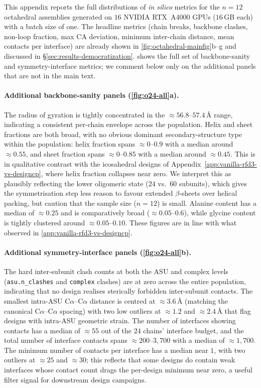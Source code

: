 \documentclass{article}
\theoremstyle{plain}
\theoremstyle{definition}
\theoremstyle{remark}
\begin{document}
This appendix reports the full distributions of \emph{in silico} metrics for the $n=12$ octahedral assemblies generated on $16$ NVIDIA RTX~A4000 GPUs ($16$\,GB each) with a batch size of one. The headline metrics (chain breaks, backbone clashes, non-loop fraction, max CA deviation, minimum inter-chain distance, mean contacts per interface) are already shown in \cref{fig:octahedral-mainfig}b--g and discussed in \S\ref{sec:results-democratization}.  shows the full set of backbone-sanity and symmetry-interface metrics; we comment below only on the additional panels that are not in the main text.

\paragraph{Additional backbone-sanity panels (\cref{fig:o24-all}a).} The radius of gyration is tightly concentrated in the $\approx 56.8$--$57.4$\,\AA{} range, indicating a consistent per-chain envelope across the population. Helix and sheet fractions are both broad, with no obvious dominant secondary-structure type within the population: helix fraction spans $\approx 0$--$0.9$ with a median around $\approx 0.55$, and sheet fraction spans $\approx 0$--$0.85$ with a median around $\approx 0.45$. This is in qualitative contrast with the icosahedral designs of Appendix~\ref{app:vanilla-rfd3-vs-designcp}, where helix fraction collapses near zero. We interpret this as plausibly reflecting the lower oligomeric state ($24$ vs.\ $60$ subunits), which gives the symmetrisation step less reason to favour extended $\beta$-sheets over helical packing, but caution that the sample size ($n=12$) is small. Alanine content has a median of $\approx 0.25$ and is comparatively broad ($\approx 0.05$--$0.6$), while glycine content is tightly clustered around $\approx 0.05$--$0.10$. These figures are in line with what observed in \cref{app:vanilla-rfd3-vs-designcp}.

\paragraph{Additional symmetry-interface panels (\cref{fig:o24-all}b).} The hard inter-subunit clash counts at both the ASU and complex levels (\texttt{asu.n\_clashes} and \texttt{complex} clashes) are at zero across the entire population, indicating that no design realises sterically forbidden inter-subunit contacts. The smallest intra-ASU C$\alpha$--C$\alpha$ distance is centred at $\approx 3.6$\,\AA{} (matching the canonical C$\alpha$--C$\alpha$ spacing) with two low outliers at $\approx 1.2$ and $\approx 2.4$\,\AA{} that flag designs with intra-ASU geometric strain. The number of interfaces showing contacts has a median of $\approx 55$ out of the $24$ chains' interface budget, and the total number of interface contacts spans $\approx 200$--$3{,}700$ with a median of $\approx 1{,}700$. The minimum number of contacts per interface has a median near $1$, with two outliers at $\approx 25$ and $\approx 30$; this reflects that some designs do contain weak interfaces whose contact count drags the per-design minimum near zero, a useful filter signal for downstream design campaigns.
\end{document}
